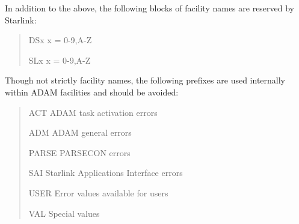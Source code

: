 \documentclass[twoside,11pt,nolof,noabs]{starlink}
\renewcommand{\_}{{\tt\char'137}}
\begin{document}
\goodbreak
In addition to the above, the following blocks of facility names
are reserved by Starlink:
\begin{quote}
\begin{aligndesc}
\item[DSx] x = 0-9,A-Z
\item[SLx] x = 0-9,A-Z
\end{aligndesc}
\end{quote}
\goodbreak
Though not strictly facility names, the following prefixes are used internally
within ADAM facilities and should be avoided:
\begin{quote}
\begin{aligndesc}
\item[ACT] ADAM task activation errors
\item[ADM] ADAM general errors
\item[PARSE] PARSECON errors
\item[SAI] Starlink Applications Interface errors
\item[USER] Error values available for users
\item[VAL] Special values
\end{aligndesc}
\end{quote}
\end{document}
